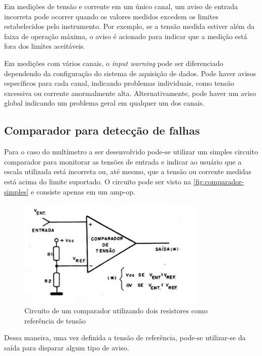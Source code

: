 Em medições de tensão e corrente em um único canal, um aviso de entrada incorreta pode ocorrer quando os valores medidos excedem os limites estabelecidos pelo instrumento. Por exemplo, se a tensão medida estiver além da faixa de operação máxima, o aviso é acionado para indicar que a medição está fora dos limites aceitáveis.

Em medições com vários canais, o \textit{input warning} pode ser diferenciado dependendo da configuração do sistema de aquisição de dados. Pode haver avisos específicos para cada canal, indicando problemas individuais, como tensão excessiva ou corrente anormalmente alta. Alternativamente, pode haver um aviso global indicando um problema geral em qualquer um dos canais.

\subsection{Comparador para detecção de falhas} \label{subsec:compfalhas}

Para o caso do multímetro a ser desenvolvido pode-se utilizar um simples circuito comparador para monitorar as tensões de entrada e indicar ao usuário que a escala utilizada está incorreta ou, até mesmo, que a tensão ou corrente medidas está acima do limite suportado. O circuito pode ser visto na \autoref{fig:comparador-simples} e consiste apenas em um \gls{amp-op}.

\begin{figure}[htb]
    \caption{Circuito de um comparador utilizando dois resistores como referência de tensão}
    \label{fig:comparador-simples}
    \includegraphics[width=0.8\textwidth]{figuras/ampop-comparador.png}
\end{figure}

Dessa maneira, uma vez definida a tensão de referência, pode-se utilizar-se da saída para disparar algum tipo de aviso.

